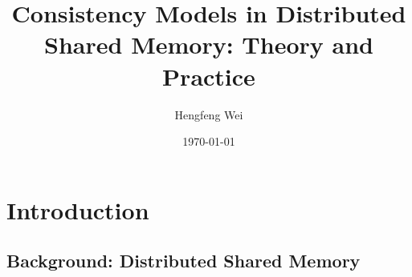\documentclass{beamer}
\title[]{Consistency Models in Distributed Shared Memory: Theory and Practice}
\author{Hengfeng Wei}
\institute{ICS, NJU \\ hengxin0912@gmail.com}
\date{\today}
\begin{document}

\begin{frame}
  \titlepage
\end{frame}


\section{Introduction}

\subsection{Background: Distributed Shared Memory}
\end{document}
